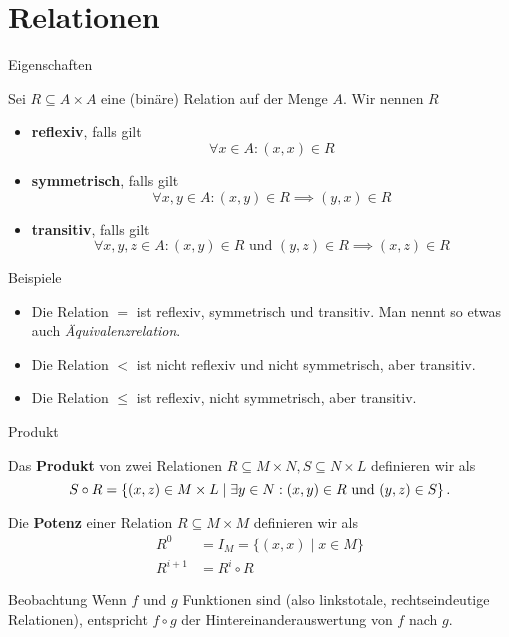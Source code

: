 \section{Relationen}
\begin{frame}{Eigenschaften}
	\begin{Definition}
		Sei $R \subseteq A \times A$ eine (binäre) Relation auf der Menge $A$. Wir nennen $R$
		\begin{itemize}[<+->]
			\item \textbf{reflexiv}, falls gilt $$\forall x \in A: (x,x) \in R$$
			\item \textbf{symmetrisch}, falls gilt $$\forall x,y \in A: (x,y) \in R \implies (y,x) \in R$$
			\item \textbf{transitiv}, falls gilt $$\forall x,y,z \in A: (x,y) \in R \text{ und } (y,z) \in R \implies (x,z) \in R$$
		\end{itemize}
	\end{Definition}
\end{frame}

\begin{frame}{Beispiele}
	\begin{itemize}
		\item Die Relation $=$ ist \pause reflexiv, symmetrisch und transitiv. Man nennt so etwas auch \emph{Äquivalenzrelation}.
		\item \pause Die Relation $<$ ist \pause nicht reflexiv und nicht symmetrisch, aber transitiv.
		\item \pause Die Relation $\leq$ ist \pause reflexiv, nicht symmetrisch, aber transitiv.
	\end{itemize}
\end{frame}

\begin{frame}{Produkt}
	\begin{Definition}
		Das \textbf{Produkt} von zwei Relationen $R \subseteq M \times N, S \subseteq N \times L$ definieren wir als $$S \circ R = \left\{(x,z) \in M \times L \;\middle|\; \exists y \in N : (x,y) \in R \text{ und } (y,z) \in S \right\}.$$
	\end{Definition}	
	\pause
	
	\begin{Definition}
		Die \textbf{Potenz} einer Relation $R \subseteq M \times M$ definieren wir als
		\begin{align*}
			R^0 &= I_M = \{(x,x) \mid x \in M \} \\
			R^{i+1} &= R^i \circ R
		\end{align*}
	\end{Definition}

	\pause
	\begin{block}{Beobachtung}
		Wenn $f$ und $g$ Funktionen sind (also linkstotale, rechtseindeutige Relationen), entspricht $f \circ g$ der Hintereinanderauswertung von $f$ nach $g$.
	\end{block}
\end{frame}

